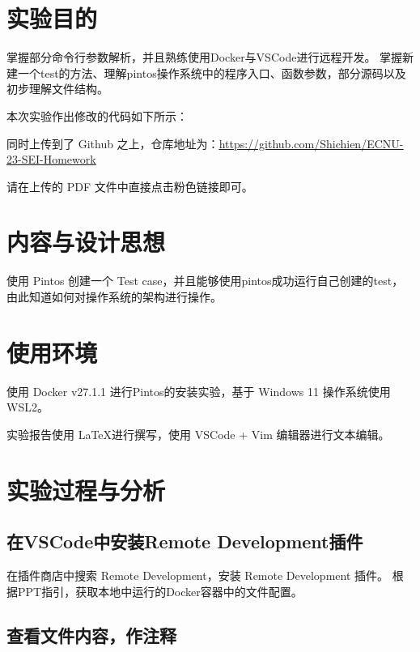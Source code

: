 \tableofcontents %

\section{实验目的}

掌握部分命令行参数解析，并且熟练使用Docker与VSCode进行远程开发。
掌握新建一个test的方法、理解pintos操作系统中的程序入口、函数参数，部分源码以及初步理解文件结构。

本次实验作出修改的代码如下所示：

同时上传到了 Github 之上，仓库地址为：\href{https://github.com/Shichien/ECNU-23-SEI-Homework/tree/main/%E6%93%8D%E4%BD%9C%E7%B3%BB%E7%BB%9F/%E5%AE%9E%E8%B7%B5%E8%AF%BE%E4%BD%9C%E4%B8%9A/Lec%202/lst2}{\underline{https://github.com/Shichien/ECNU-23-SEI-Homework}}

请在上传的 PDF 文件中直接点击粉色链接即可。

\section{内容与设计思想}

使用 Pintos 创建一个 Test case，并且能够使用pintos成功运行自己创建的test，由此知道如何对操作系统的架构进行操作。

\section{使用环境}

使用 Docker v27.1.1 进行Pintos的安装实验，基于 Windows 11 操作系统使用 WSL2。

实验报告使用 \LaTeX 进行撰写，使用 VSCode + Vim 编辑器进行文本编辑。

\section{实验过程与分析}

\subsection{在VSCode中安装Remote Development插件}

在插件商店中搜索 Remote Development，安装 Remote Development 插件。
根据PPT指引，获取本地中运行的Docker容器中的文件配置。

\subsection{查看文件内容，作注释}

